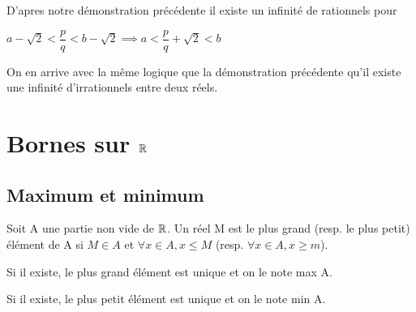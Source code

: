 \documentclass[a4paper, 12pt]{article}
\begin{document}
\begin{demonstration}
    D'apres notre démonstration précédente il existe un infinité de rationnels pour

    $a - \sqrt{2} \lt \dfrac{p}{q} \lt b - \sqrt{2} \implies a \lt \dfrac{p}{q} + \sqrt{2} \lt b$

    \begin{rdem}
        On en arrive avec la même logique que la démonstration précédente qu'il existe une infinité d'irrationnels entre deux réels.
    \end{rdem}
\end{demonstration}
        
\section{Bornes sur $\mathbb{R}$}

\subsection{Maximum et minimum}

\begin{definition}
    Soit A une partie non vide de $\mathbb{R}$. Un réel M est le plus grand (resp. le plus petit) élément de A si $M \in A$ et
    $\forall x \in A, x \leq M$ (resp. $\forall x \in A, x \geq m$).

    Si il existe, le plus grand élément est unique et on le note max A.

    Si il existe, le plus petit élément est unique et on le note min A.
\end{definition}
\end{document}
